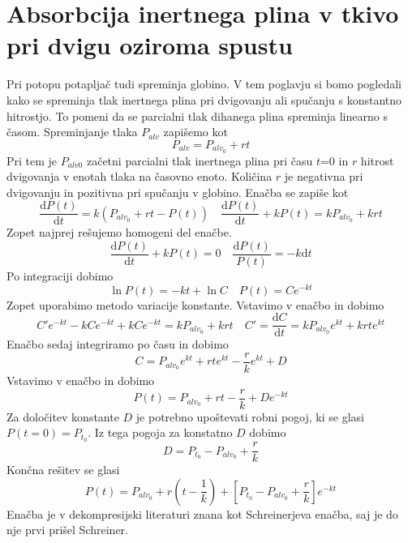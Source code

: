 \documentclass[a4paper]{article}
\begin{document}
\section{Absorbcija inertnega plina v tkivo pri dvigu oziroma spustu}
Pri potopu potapljač tudi spreminja globino. V tem poglavju si bomo pogledali kako se spreminja tlak inertnega plina pri dvigovanju ali spučanju s konstantno hitrostjo. To pomeni da se parcialni tlak dihanega plina spreminja linearno s časom. Spreminjanje tlaka $P_{alv}$  zapišemo kot
\begin{equation}
P_{alv}=P_{alv_0}+rt
\end{equation}
Pri tem je $P_{alv0}$ začetni parcialni tlak inertnega plina pri času $t$=0 in $r$ hitrost dvigovanja v enotah tlaka na časovno enoto. Količina $r$ je negativna pri dvigovanju in pozitivna pri spučanju v globino. 
Enačba se zapiše kot
\begin{equation}
  \frac{\mathrm{d} P(t)}{\mathrm{d} t}=k\left(P_{alv_0}+rt-P(t)\right) \quad  \frac{\mathrm{d} P(t)}{\mathrm{d} t} + kP(t) = kP_{alv_0}+krt 
\end{equation}   
Zopet najprej rešujemo homogeni del enačbe. 
\begin{equation}
\frac{\mathrm{d} P(t)}{\mathrm{d} t} + kP(t)=0 \quad \frac{\mathrm{d} P(t)}{P(t)} = -k\mathrm{d} t 
\end{equation}
Po integraciji dobimo
\begin{equation}
\ln P(t) = -kt + \ln C \quad P(t) = Ce^{-kt}
\end{equation}
Zopet uporabimo metodo variacije konstante. Vstavimo v enačbo in dobimo
\begin{equation}
C' e^{-kt}-kC e^{-kt}+kC e^{-kt}=kP_{alv_0}+krt \quad C'=\frac{\mathrm{d} C}{\mathrm{d} t}=kP_{alv_0}e^{kt}+krt e^{kt}
\end{equation}
Enačbo sedaj integriramo po času in dobimo
\begin{equation}
C=P_{alv_0} e^{kt}+rt e^{kt}-\frac{r}{k}e^{kt}+D
\end{equation}
Vstavimo v enačbo in dobimo
\begin{equation}
P(t)=P_{alv_0}+rt-\frac{r}{k}+De^{-kt}
\end{equation}
Za določitev konstante $D$ je potrebno upoštevati robni pogoj, ki se glasi $P(t=0)=P_{t_0}$. Iz tega pogoja za konstatno $D$ dobimo
\begin{equation}
D=P_{t_0}-P_{alv_0}+\frac{r}{k}
\end{equation}
Končna rešitev se glasi
\begin{equation}
P(t)=P_{alv_0}+r(t-\frac{1}{k})+[P_{t_0}-P_{alv_0}+\frac{r}{k}]e^{-kt}
\end{equation}
Enačba je v dekompresijski literaturi znana kot Schreinerjeva enačba, saj je do nje prvi prišel Schreiner.
\end{document}
